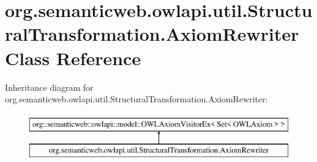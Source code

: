 \hypertarget{classorg_1_1semanticweb_1_1owlapi_1_1util_1_1_structural_transformation_1_1_axiom_rewriter}{\section{org.\-semanticweb.\-owlapi.\-util.\-Structural\-Transformation.\-Axiom\-Rewriter Class Reference}
\label{classorg_1_1semanticweb_1_1owlapi_1_1util_1_1_structural_transformation_1_1_axiom_rewriter}
}
Inheritance diagram for org.\-semanticweb.\-owlapi.\-util.\-Structural\-Transformation.\-Axiom\-Rewriter\-:\begin{figure}[H]
\begin{center}
\leavevmode
\includegraphics[height=2.000000cm]{classorg_1_1semanticweb_1_1owlapi_1_1util_1_1_structural_transformation_1_1_axiom_rewriter}
\end{center}
\end{figure}
